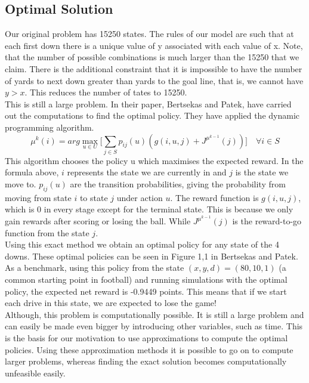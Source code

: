 \documentclass[11pt, oneside]{article}   	%
\begin{document}
\subsection{Optimal Solution}
Our original problem has 15250 states. The rules of our model are such that at each first down there is a unique value of y associated with each value of x. Note, that the number of possible combinations is much larger than the 15250 that we claim. There is the additional constraint that it is impossible to have the number of yards to next down greater than yards to the goal line, that is, we cannot have $y>x$. This reduces the number of tates to 15250.\\

This is still a large problem. In their paper, Bertsekas and Patek, have carried out the computations to find the optimal policy. They have applied the dynamic programming algorithm. 
$$
\mu^{k}(i) = arg\max\limits_{u \in U} \Big[ \sum\limits_{j \in S} p_{ij}(u)(g(i,u,j) +  J^{\mu^{k-1}}(j))\Big] \quad \forall i \in S
$$
This algorithm chooses the policy u  which maximises the expected reward. In the formula above, $i$ represents the state we are currently in and $j$ is the state we move to. $p_{ij}(u)$ are the transition probabilities, giving the probability from moving from state $i$ to state $j$ under action $u$. The reward function is $g(i,u,j)$, which is 0 in every stage except for the terminal state. This is because we only gain rewards after scoring or losing the ball. While $J^{\mu^{k-1}}(j)$ is the reward-to-go  function from the state $j$. \\

Using this exact method we obtain an optimal policy for any state of the 4 downs. These optimal policies can be seen in Figure 1,1 in Bertsekas and Patek. As a benchmark, using this policy from the state $(x,y,d)=(80,10,1)$ (a common starting point in football) and running simulations with the optimal policy, the expected net reward is -0.9449 points. This means that if we start each drive in this state, we are expected to lose the game! \\

Although, this problem is computationally possible. It is still a large problem and can easily be made even bigger by introducing other variables, such as time. This is the basis for our motivation to use approximations to compute the optimal policies. Using these approximation methods it is possible to go on to compute larger problems, whereas finding the exact solution becomes computationally unfeasible easily.
\end{document}
